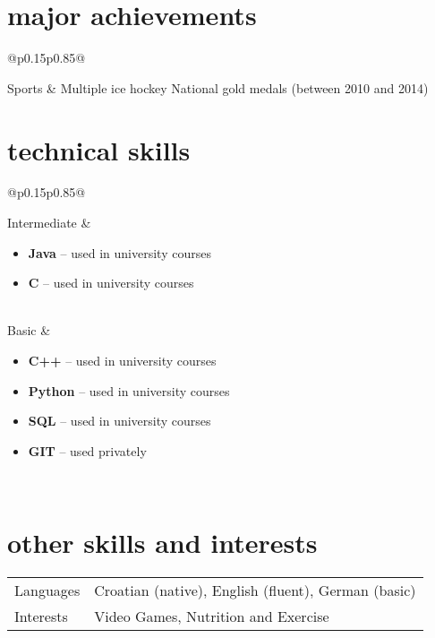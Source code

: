 \documentclass[a4paper]{article}
\makeatletter
\newlength{\tablewidth}
\newenvironment{skills}{%
\setlength{\tablewidth}{\linewidth}
\addtolength{\tablewidth}{-2\tabcolsep}
\begin{tabular}{@{}p{0.15\tablewidth}p{0.85\tablewidth}@{}}
}{%
\end{tabular}
}
\makeatother
\begin{document}
\section{major achievements}
\begin{skills}
    Sports   &   Multiple ice hockey National gold medals (between 2010 and 2014)
\end{skills}

\section{technical skills}
\begin{skills}
    Intermediate &
    \begin{itemize}
        \item \textbf{Java} -- used in university courses
        \item \textbf{C} -- used in university courses 
    \end{itemize} \\
    Basic &
    \begin{itemize}
        \item \textbf{C++} -- used in university courses
        \item \textbf{Python} -- used in university courses
        \item \textbf{SQL} -- used in university courses
        \item \textbf{GIT} -- used privately
    \end{itemize} \\
\end{skills}

\section{other skills and interests}
\begin{skills}
    Languages & Croatian (native), English (fluent), German (basic) \\
    Interests & Video Games, Nutrition and Exercise \\
\end{skills}
\end{document}
